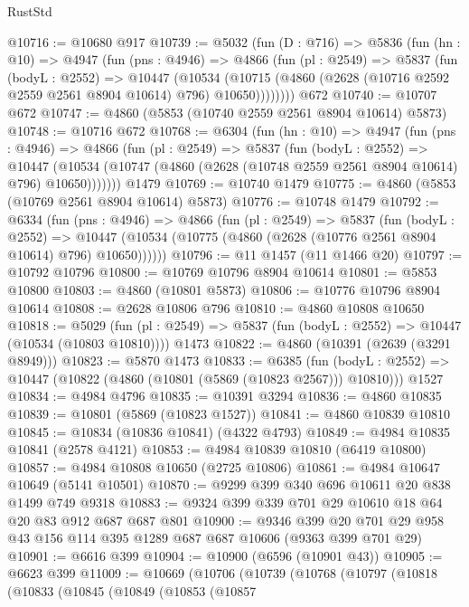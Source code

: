 \begin{lexlean}{RustStd}
\begin{coremodule}
@10716 := @10680 @917
@10739 := @5032
    (fun (D : @716) =>
    @5836
      (fun (hn : @10) =>
      @4947
        (fun (pns : @4946) =>
        @4866
          (fun (pl : @2549) =>
          @5837
            (fun (bodyL : @2552) =>
            @10447
              (@10534
                (@10715 (@4860 (@2628 (@10716 @2592 @2559 @2561 @8904 @10614) @796) @10650))))))))
    @672
@10740 := @10707 @672
@10747 := @4860 (@5853 (@10740 @2559 @2561 @8904 @10614) @5873)
@10748 := @10716 @672
@10768 := @6304
    (fun (hn : @10) =>
    @4947
      (fun (pns : @4946) =>
      @4866
        (fun (pl : @2549) =>
        @5837
          (fun (bodyL : @2552) =>
          @10447 (@10534 (@10747 (@4860 (@2628 (@10748 @2559 @2561 @8904 @10614) @796) @10650)))))))
    @1479
@10769 := @10740 @1479
@10775 := @4860 (@5853 (@10769 @2561 @8904 @10614) @5873)
@10776 := @10748 @1479
@10792 := @6334
    (fun (pns : @4946) =>
    @4866
      (fun (pl : @2549) =>
      @5837
        (fun (bodyL : @2552) =>
        @10447 (@10534 (@10775 (@4860 (@2628 (@10776 @2561 @8904 @10614) @796) @10650))))))
@10796 := @11 @1457 (@11 @1466 @20)
@10797 := @10792 @10796
@10800 := @10769 @10796 @8904 @10614
@10801 := @5853 @10800
@10803 := @4860 (@10801 @5873)
@10806 := @10776 @10796 @8904 @10614
@10808 := @2628 @10806 @796
@10810 := @4860 @10808 @10650
@10818 := @5029
    (fun (pl : @2549) => @5837 (fun (bodyL : @2552) => @10447 (@10534 (@10803 @10810))))
    @1473
@10822 := @4860 (@10391 (@2639 (@3291 @8949)))
@10823 := @5870 @1473
@10833 := @6385
    (fun (bodyL : @2552) => @10447 (@10822 (@4860 (@10801 (@5869 (@10823 @2567))) @10810)))
    @1527
@10834 := @4984 @4796
@10835 := @10391 @3294
@10836 := @4860 @10835
@10839 := @10801 (@5869 (@10823 @1527))
@10841 := @4860 @10839 @10810
@10845 := @10834 (@10836 @10841) (@4322 @4793)
@10849 := @4984 @10835 @10841 (@2578 @4121)
@10853 := @4984 @10839 @10810 (@6419 @10800)
@10857 := @4984 @10808 @10650 (@2725 @10806)
@10861 := @4984 @10647 @10649 (@5141 @10501)
@10870 := @9299 @399 @340 @696 @10611 @20 @838 @1499 @749 @9318
@10883 := @9324 @399 @339 @701 @29 @10610 @18 @64 @20 @83 @912 @687 @687 @801
@10900 := @9346
    @399
    @20
    @701
    @29
    @958
    @43
    @156
    @114
    @395
    @1289
    @687
    @687
    @10606
    (@9363 @399 @701 @29)
@10901 := @6616 @399
@10904 := @10900 (@6596 (@10901 @43))
@10905 := @6623 @399
@11009 := @10669
    (@10706
      (@10739
        (@10768
          (@10797
            (@10818
              (@10833
                (@10845
                  (@10849
                    (@10853
                      (@10857

\end{coremodule}
\end{lexlean}
